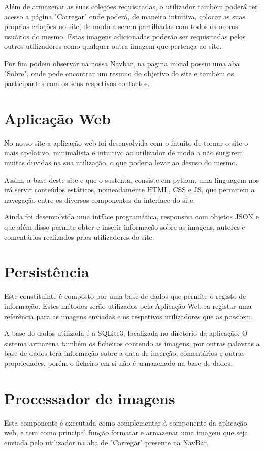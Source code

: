 \documentclass{report}
\begin{document}
Além de armazenar as suas coleções requisitadas, o utilizador também poderá ter acesso a página "Carregar" onde poderá, de maneira intuitiva, colocar as suas proprias criações no site, de modo a serem partilhadas com todos os outros usuários do mesmo. Estas imagens adicionadas poderão ser requisitadas pelos outros utilizadores como qualquer outra imagem que pertença ao site.

Por fim podem observar na nossa Navbar, na pagina inicial possui uma aba "Sobre", onde pode encontrar um resumo do objetivo do site e também os participantes com os seus respetivos contactos. 


\section{Aplicação Web}
No nosso site a aplicação web foi desenvolvida com o intuito de tornar o site o mais apelativo, minimalista e intuitivo ao utilizador de modo a não surgirem muitas duvidas na sua utilização, o que poderia levar ao desuso do mesmo. 

Assim, a base deste site e que o sustenta, consiste em python, uma linguagem nos irá servir conteúdos estáticos, nomeadamente HTML, CSS e JS, que permitem a navegação entre os diversos componentes da interface do site.

Ainda foi desenvolvida uma intface programática, responsiva com objetos JSON e que além disso permite obter e inserir informação sobre as imagens, autores e comentários realizados prlos utilizadores do site.



\section{Persistência}
Este constituinte é composto por uma base de dados que permite o registo de informação. Estes métodos serão utilizados pela Aplicação Web ra registar uma referência para as imagens enviadas e os respetivos utilizadores que as possuem. 

A base de dados utilizada é a SQLite3, localizada no diretório da aplicação. O sistema armazena também  os ficheiros contendo as imagens, por outras palavras a base de dados terá informação sobre a data de inserção, comentários e outras propriedades, porém o ficheiro em si não é armazenado na base de dados.


\section{Processador de imagens}
Esta componente é executada como complementar à componente da aplicação web, e tem como principal função formatar e armazenar uma imagem que seja enviada pelo utilizador na aba de "Carregar" presente na NavBar.
\end{document}

